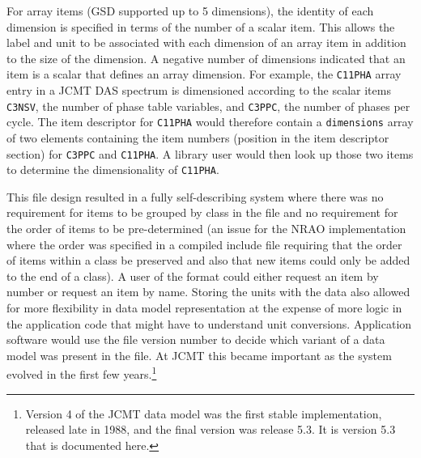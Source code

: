 \documentclass[final,authoryear,5p,times,twocolumn]{elsarticle}
\begin{document}
For array items (GSD supported up to 5 dimensions), the
identity of each dimension is specified in terms of the number of a
scalar item. This allows the label and unit to be associated with each
dimension of an array item in addition to the size of the dimension. A
negative number of dimensions indicated that an item is a scalar that
defines an array dimension. For example, the \texttt{C11PHA} array
entry in a JCMT DAS spectrum \citep{1986SPIE..598..134B} is
dimensioned according to the scalar items \texttt{C3NSV}, the number
of phase table variables, and \texttt{C3PPC}, the number of phases per
cycle. The item descriptor for \texttt{C11PHA} would therefore contain
a \texttt{dimensions} array of two elements containing the item
numbers (position in the item descriptor section) for \texttt{C3PPC}
and \texttt{C11PHA}. A library user would then look up those two items
to determine the dimensionality of \texttt{C11PHA}.

This file design resulted in a fully self-describing system
where there was no requirement for items to be grouped by class in the
file and no requirement for the order of items to be pre-determined
(an issue for the NRAO implementation where the order was specified in
a compiled include file requiring that the order of items within a
class be preserved and also that new items could only be added to the
end of a class). A user of the format could either
request an item by number or request an item by name. Storing the
units with the data also allowed for more flexibility in data model
representation at the expense of more logic in the application code
that might have to understand unit conversions. Application software
would use the file version number to decide which variant of a data
model was present in the file. At JCMT this became important as the
system evolved in the first few years.\footnote{Version 4 of the JCMT
  data model was the first stable implementation, released late in
  1988, and the final version was release 5.3. It is version 5.3 that
  is documented here.}
\end{document}
